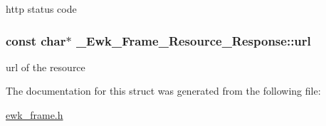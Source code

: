 http status code \hypertarget{struct__Ewk__Frame__Resource__Response_a581ef38fb862f814b740c05b85157ad4}{
\subsubsection[{url}]{\setlength{\rightskip}{0pt plus 5cm}const char$\ast$ \+\_\+\+Ewk\+\_\+\+Frame\+\_\+\+Resource\+\_\+\+Response\+::url}}\label{struct__Ewk__Frame__Resource__Response_a581ef38fb862f814b740c05b85157ad4}
url of the resource 

The documentation for this struct was generated from the following file\+:\begin{DoxyCompactItemize}
\item 
\hyperlink{ewk__frame_8h}{ewk\+\_\+frame.\+h}\end{DoxyCompactItemize}
